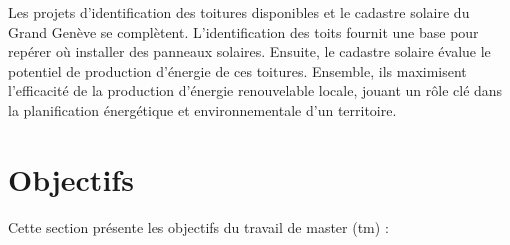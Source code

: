 \par{Les projets d'identification des toitures disponibles et le cadastre solaire du Grand Genève se complètent. L'identification des toits fournit une base pour repérer où installer des panneaux solaires. Ensuite, le cadastre solaire évalue le potentiel de production d'énergie de ces toitures. Ensemble, ils maximisent l'efficacité de la production d'énergie renouvelable locale, jouant un rôle clé dans la planification énergétique et environnementale d'un territoire.}

\newpage
\section{Objectifs}
Cette section présente les objectifs du travail de master (\acrshort{tm}) :

